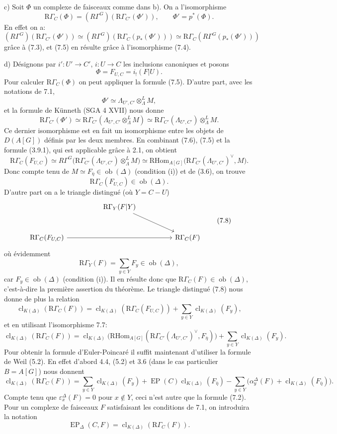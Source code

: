 \documentclass[11pt]{article}
\providecommand{\RHom}{\mathrm{RHom}}
\providecommand{\EP}{\operatorname{EP}}
\providecommand{\Ob}{\operatorname{ob}}
\providecommand{\RHom}{\mathrm{RHom}}
\providecommand{\RHom}{\mathrm R\mathcal{H}om}
\providecommand{\Ob}{\operatorname{ob}}
\providecommand{\EP}{\operatorname{EP}}
\providecommand{\Ob}{\operatorname{Ob}}
\providecommand{\clK}[1]{\operatorname{cl}_{K(#1)}}
\providecommand{\RG}{\mathrm R\Gamma}
\providecommand{\RHom}{\mathrm{RHom}}
\providecommand{\Ob}{\operatorname{ob}}
\providecommand{\Ob}{\operatorname{Ob}}
\begin{document}
c) Soit $\Phi$ un complexe de faisceaux comme dans b). On a l'isomorphisme
\[
\RG_C(\Phi)=(R\Gamma^G)(\RG_{C'}(\Phi')),
\qquad \Phi'=p^*(\Phi).
\tag{7.5}
\]
En effet on a:
\[
(R\Gamma^G)(\RG_{C'}(\Phi'))
\simeq
(R\Gamma^G)(\RG_C(p_*(\Phi')))
\simeq
\RG_C(R\Gamma^G(p_*(\Phi')))
\]
grâce à (7.3), et (7.5) en résulte grâce à l'isomorphisme (7.4).

d) Désignons par $i':U'\to C'$, $i:U\to C$ les inclusions canoniques et posons
\[
\Phi=F_{U,C}=i_!(F|U).
\]
Pour calculer $\RG_C(\Phi)$ on peut appliquer la formule (7.5). D'autre part, avec les notations de 7.1,
\[
\Phi'\simeq \Lambda_{U',C'}\otimes_\Lambda^L M,
\]
et la formule de Künneth (SGA 4 XVII) nous donne
\[
\RG_{C'}(\Phi')
\simeq
\RG_{C'}(\Lambda_{U',C'}\otimes_\Lambda^L M)
\simeq
\RG_{C'}(\Lambda_{U',C'})\otimes_\Lambda^L M.
\tag{7.6}
\]
Ce dernier isomorphisme est en fait un isomorphisme entre les objets de $D(A[G])$ définis par les deux membres. En combinant (7.6), (7.5) et la formule (3.9.1), qui est applicable grâce à 2.1, on obtient
\[
\RG_C(F_{U,C})
\simeq
R\Gamma^G\bigl(\RG_{C'}(\Lambda_{U',C'})\otimes_\Lambda^L M\bigr)
\simeq
\RHom_{A[G]}\bigl(\RG_{C'}(\Lambda_{U',C'})^\vee,M\bigr).
\tag{7.7}
\]
Donc compte tenu de $M\simeq F_{\bar\eta}\in\Ob(\Delta)$ (condition (i)) et de (3.6), on trouve
\[
\RG_C(F_{U,C})\in\Ob(\Delta).
\]
D'autre part on a le triangle distingué (où $Y=C-U$)
\[
\begin{tikzcd}[column sep=huge,row sep=large]
& \RG_Y(F|Y) \arrow[dr] & \\
\RG_C(F_{U,C}) \arrow[rr] && \RG_C(F)
\end{tikzcd}
\tag{7.8}
\]
où évidemment
\[
\RG_Y(F)=\sum_{y\in Y}F_y\in\Ob(\Delta),
\]
car $F_y\in\Ob(\Delta)$ (condition (i)). Il en résulte donc que $\RG_C(F)\in\Ob(\Delta)$, c'est-à-dire la première assertion du théorème. Le triangle distingué (7.8) nous donne de plus la relation
\[
\clK{\Delta}(\RG_C(F))
=
\clK{\Delta}(\RG_C(F_{U,C}))
+\sum_{y\in Y}\clK{\Delta}(F_y),
\]
et en utilisant l'isomorphisme 7.7:
\[
\clK{\Delta}(\RG_C(F))
=
\clK{\Delta}\bigl(\RHom_{A[G]}(\RG_{C'}(\Lambda_{U',C'})^\vee,F_{\bar\eta})\bigr)
+\sum_{y\in Y}\clK{\Delta}(F_y).
\]
Pour obtenir la formule d'Euler-Poincaré il suffit maintenant d'utiliser la formule de Weil (5.2). En effet d'abord 4.4, (5.2) et 3.6 (dans le cas particulier $B=A[G]$) nous donnent
\[
\clK{\Delta}(\RG_C(F))
=
\sum_{y\in Y}\clK{\Delta}(F_y)
+\EP(C)\clK{\Delta}(F_{\bar\eta})
-\sum_{y\in Y}\bigl(\alpha_y^\Delta(F)+\clK{\Delta}(F_{\bar\eta})\bigr).
\]
Compte tenu que $\varepsilon_x^\Delta(F)=0$ pour $x\notin Y$, ceci n'est autre que la formule (7.2). Pour un complexe de faisceaux $F$ satisfaisant les conditions de 7.1, on introduira la notation
\[
\EP_\Delta(C,F)=\clK{\Delta}(\RG_C(F)).
\]
\end{document}
